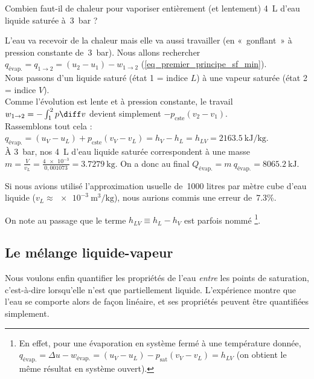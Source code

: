 			\begin{anexample}
			
			Combien faut-il de chaleur pour vaporiser entièrement (et lentement) \SI{4}{\liter} d’eau liquide saturée à~\SI{3}{\bar} ?
			
				\begin{answer}
					L’eau va recevoir de la chaleur mais elle va aussi travailler (en «~gonflant~» à pression constante de~\SI{3}{\bar}). Nous allons rechercher $q_\text{évap.} = q_{1 \to 2} = (u_2 - u_1) - w_{1 \to 2}$ (\ref{eq_premier_principe_sf_min}).\\
					Nous passons d’un liquide saturé (état 1 = indice $L$) à une vapeur saturée (état 2 = indice $V$).\\
					Comme l’évolution est lente et à pression constante, le travail $w_{1 \to 2} = -\int_1^2 p \diff v$ devient simplement $-p_\text{cste} (v_2 - v_1) $.\\
					Rassemblons tout cela : $q_\text{évap.} = (u_V - u_L) + p_\text{cste} (v_V - v_L) = h_V - h_L = h_{LV} = \SI{2163,5}{\kilo\joule\per\kilogram}$.\\
					À \SI{3}{\bar}, nos \SI{4}{\liter} d’eau liquide saturée correspondent à une masse $m = \frac{V}{v_L} = \frac{\num{4e-3}}{0,001073} = \SI{3,7279}{\kilogram} $. On a donc au final $Q_\text{évap.} = m \ q_\text{évap.} = \SI{8065,2}{\kilo\joule}$.
				\begin{remark}Si nous avions utilisé l’approximation usuelle de~\num{1000} litres par mètre cube d’eau liquide ($v_L \approx \SI{e-3}{\metre\cubed\per\kilogram}$), nous aurions commis une erreur de~\num{+7,3}\%.\end{remark}\end{answer}
			\end{anexample}

		On note au passage que le terme $h_{LV} \equiv h_L - h_V$ est parfois nommé \footnote{En effet, pour une évaporation en système fermé à une température donnée, $q_\text{évap.} = \Delta u - w_\text{évap.} = (u_V - u_L) - p_\text{sat} (v_V - v_L) = h_{LV} $ (on obtient le même résultat en système ouvert).}\nolinebreak.




	\subsection{Le mélange liquide-vapeur}
	\label{ch_melange_liquide_vapeur}
	
		Nous voulons enfin quantifier les propriétés de l’eau \emph{entre} les points de saturation, c’est-à-dire lorsqu’elle n’est que partiellement liquide. L’expérience montre que l’eau se comporte alors de façon linéaire, et ses propriétés peuvent être quantifiées simplement.


